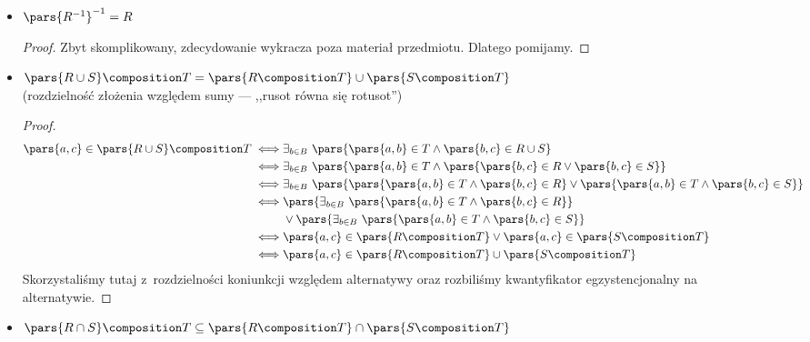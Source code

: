 \begin{description}
\begin{itemize}
\begin{proof}
                \end{proof}
            \item \(\pars{R^{-1}}^{-1} = R\)
                \begin{proof}
                    Zbyt skomplikowany, zdecydowanie wykracza poza materiał przedmiotu. Dlatego pomijamy.
                \end{proof}
            \item \(\pars{R \cup S} \composition T = \pars{R \composition T} \cup \pars{S \composition T}\)\\
            (rozdzielność złożenia względem sumy --- ,,rusot równa się rotusot'')
                \begin{proof}
                    \begin{equation*}
                        \begin{split}
                            \pars{a, c} \in \pars{R \cup S} \composition T
                                \iff& \exists_{b \in B} \ \pars{\pars{a, b} \in T \land \pars{b, c} \in R \cup S}\\
                                \iff& \exists_{b \in B} \ \pars{\pars{a, b} \in T \land \pars{\pars{b, c} \in R \lor \pars{b, c} \in S}}\\
                                \iff& \exists_{b \in B} \ \pars{\pars{\pars{a, b} \in T \land \pars{b, c} \in R} \lor \pars{\pars{a, b} \in T \land \pars{b, c} \in S}}\\
                                \iff& \pars{\exists_{b \in B} \ \pars{\pars{a, b} \in T \land \pars{b, c} \in R}}\\
                                    &\lor \pars{\exists_{b \in B} \ \pars{\pars{a, b} \in T \land \pars{b, c} \in S}}\\
                                \iff& \pars{a, c} \in \pars{R \composition T} \lor \pars{a, c} \in \pars{S \composition T}\\
                                \iff& \pars{a, c} \in \pars{R \composition T} \cup \pars{S \composition T}
                        \end{split}
                    \end{equation*}
                    Skorzystaliśmy tutaj z~rozdzielności koniunkcji względem alternatywy oraz rozbiliśmy kwantyfikator egzystencjonalny na alternatywie.
                \end{proof}
            \item \(\pars{R \cap S} \composition T \subseteq \pars{R \composition T} \cap \pars{S \composition T}\)

\end{itemize}
\end{description}
